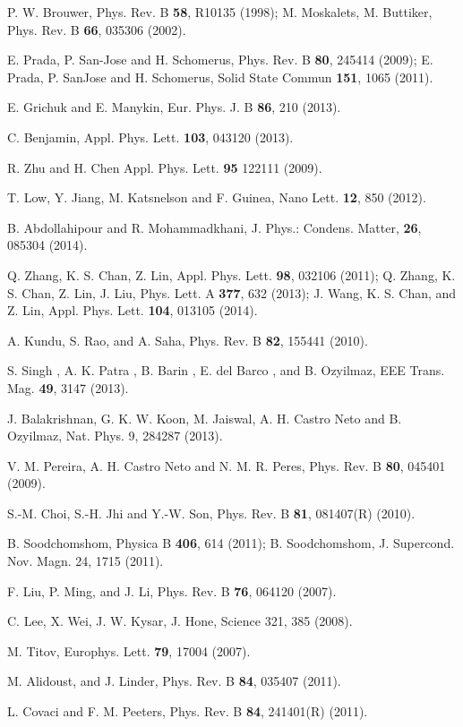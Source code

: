 \documentclass[doublecol]{epl2}
\begin{document}
\begin{thebibliography}{0}
P. W. Brouwer, Phys. Rev. B {\bf 58}, R10135 (1998); M. Moskalets,
M. Buttiker, Phys. Rev. B {\bf 66}, 035306 (2002).

 E. Prada, P. San-Jose and H.
Schomerus,  Phys. Rev. B  {\bf 80}, 245414 (2009); E. Prada, P. SanJose and H. Schomerus, Solid State Commun
{\bf 151}, 1065 (2011).

E. Grichuk and E. Manykin,  Eur. Phys. J. B  {\bf 86}, 210
(2013).

 C. Benjamin, Appl. Phys. Lett. {\bf 103}, 043120 (2013).

R. Zhu and H. Chen Appl. Phys. Lett.  {\bf 95} 122111 (2009).

T. Low, Y. Jiang, M. Katsnelson and F. Guinea, Nano Lett.
{\bf 12}, 850 (2012).

B. Abdollahipour and R. Mohammadkhani, J. Phys.: Condens. Matter,
{\bf 26}, 085304 (2014).

Q. Zhang, K. S. Chan, Z. Lin,  Appl. Phys. Lett. {\bf 98}, 032106 (2011);
Q. Zhang, K. S. Chan, Z. Lin, J. Liu, Phys. Lett. A {\bf 377}, 632 (2013);
J. Wang, K. S. Chan, and Z. Lin, Appl. Phys. Lett. {\bf 104}, 013105 (2014).

A. Kundu, S. Rao, and A. Saha, Phys. Rev. B {\bf 82}, 155441 (2010).

S. Singh , A. K. Patra , B. Barin , E. del Barco , and B. Ozyilmaz, EEE Trans. Mag. {\bf 49}, 3147 (2013).

J. Balakrishnan, G. K. W. Koon, M. Jaiswal, A. H. Castro Neto and B. Ozyilmaz, Nat. Phys. 9, 284287 (2013).

V. M. Pereira, A. H. Castro Neto and N. M. R. Peres, Phys. Rev. B  {\bf 80}, 045401 (2009).

S.-M. Choi, S.-H. Jhi and Y.-W. Son, Phys. Rev. B  {\bf 81}, 081407(R) (2010).

B. Soodchomshom, Physica B {\bf 406}, 614 (2011);
B. Soodchomshom, J. Supercond. Nov. Magn. 24, 1715 (2011).

F. Liu, P. Ming, and J. Li, Phys. Rev. B {\bf 76}, 064120 (2007).

C. Lee, X. Wei, J. W. Kysar, J. Hone, Science 321, 385 (2008).

M. Titov, Europhys. Lett. {\bf 79}, 17004 (2007).

M. Alidoust, and J. Linder, Phys. Rev. B  {\bf 84}, 035407 (2011).

 L. Covaci and F. M. Peeters, Phys. Rev. B {\bf 84}, 241401(R) (2011).

\end{thebibliography}
\end{document}
